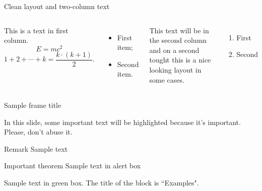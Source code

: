 \documentclass[aspectratio=169,t,xcolor=table]{beamer}
\begin{document}
\begin{frame}{Clean layout and two-column text}
    
    \begin{columns}
        This is a text in first column.
        $$E=mc^2$$
        $$ 1 + 2 + \cdots + k =  \frac{k \cdot (k + 1)}{2}.$$
        \begin{itemize}
        \item First item;
        \item Second item.
        \end{itemize}
        
        This text will be in the second column
        and on a second tought this is a nice looking
        layout in some cases.
        
        \begin{enumerate}
            \item First
            \item Second
        \end{enumerate}
    \end{columns}
    
\end{frame}


\begin{frame}{Sample frame title}
    
    In this slide, some important text will be
    \alert{highlighted} because it's important. Please, don't abuse it.
    
    \begin{block}{Remark}
        Sample text
    \end{block}
    
    \begin{alertblock}{Important theorem}
        Sample text in \colorbox[rgb]{1,0,0}{alert box}
    \end{alertblock}
    
    \begin{examples}
        Sample text in green box. The title of the block is ``Examples".
    \end{examples}
    
\end{frame}


\end{document}

